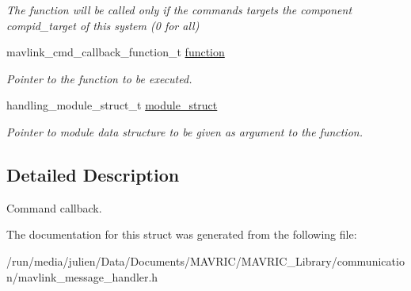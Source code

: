 \begin{DoxyCompactItemize}
\begin{DoxyCompactList}\small\item\em The function will be called only if the commands targets the component compid\+\_\+target of this system (0 for all) \end{DoxyCompactList}\item 
\hypertarget{structmavlink__message__handler__cmd__callback__t_a5701f8836553e52e2a1d95507b87cd0b}{mavlink\+\_\+cmd\+\_\+callback\+\_\+function\+\_\+t \hyperlink{structmavlink__message__handler__cmd__callback__t_a5701f8836553e52e2a1d95507b87cd0b}{function}}\label{structmavlink__message__handler__cmd__callback__t_a5701f8836553e52e2a1d95507b87cd0b}

\begin{DoxyCompactList}\small\item\em Pointer to the function to be executed. \end{DoxyCompactList}\item 
\hypertarget{structmavlink__message__handler__cmd__callback__t_ad757c354f919b2768360c9f762604667}{handling\+\_\+module\+\_\+struct\+\_\+t \hyperlink{structmavlink__message__handler__cmd__callback__t_ad757c354f919b2768360c9f762604667}{module\+\_\+struct}}\label{structmavlink__message__handler__cmd__callback__t_ad757c354f919b2768360c9f762604667}

\begin{DoxyCompactList}\small\item\em Pointer to module data structure to be given as argument to the function. \end{DoxyCompactList}\end{DoxyCompactItemize}


\subsection{Detailed Description}
Command callback. 

The documentation for this struct was generated from the following file\+:\begin{DoxyCompactItemize}
\item 
/run/media/julien/\+Data/\+Documents/\+M\+A\+V\+R\+I\+C/\+M\+A\+V\+R\+I\+C\+\_\+\+Library/communication/mavlink\+\_\+message\+\_\+handler.\+h\end{DoxyCompactItemize}
